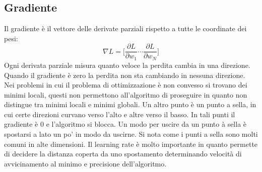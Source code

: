 	\subsection{Gradiente}
	Il gradiente \`e il vettore delle derivate parziali rispetto a tutte le coordinate dei pesi:
	$$\nabla L = \biggl[\dfrac{\partial L}{\partial w_1}\cdots\dfrac{\partial L}{\partial w_N}\biggr]$$
	Ogni derivata parziale misura quanto veloce la perdita cambia in una direzione.
	Quando il gradiente \`e zero la perdita non sta cambiando in nessuna direzione.\\
	
	Nei problemi in cui il problema di ottimizzazione \`e non convesso si trovano dei minimi locali, questi non permettono all'algoritmo di proseguire in quanto non distingue tra minimi locali e minimi globali.
	Un altro punto \`e un punto a sella, in cui certe direzioni curvano verso l'alto e altre verso il basso.
	In tali punti il gradiente \`e $0$ e l'algoritmo si blocca.
	Un modo per uscire da un punto \`a sella \`e spostarsi a lato un po' in modo da uscirne.
	Si nota come i punti a sella sono molti comuni in alte dimensioni.
	Il learning rate \`e molto importante in quanto permette di decidere la distanza coperta da uno spostamento determinando velocit\`a di avvicinamento al minimo e precisione dell'algoritmo.
